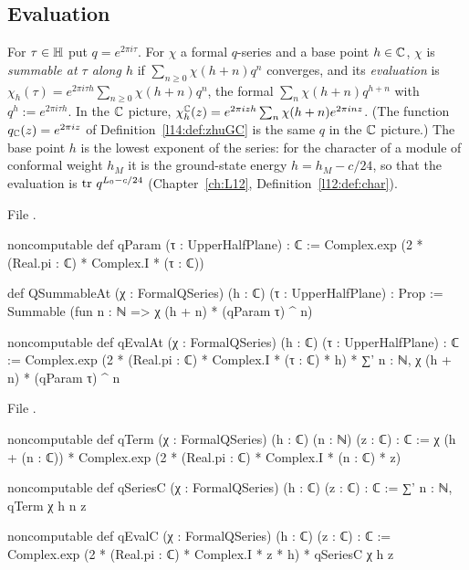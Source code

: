 \subsection{Evaluation}

\begin{definition}\label{l14:def:qeval}
For $\tau\in\mathbb{H}$ put $q = e^{2\pi i\tau}$. For $\chi$ a formal $q$-series and a base point $h\in{\mathbb{C}}$, $\chi$ is
\emph{summable at $\tau$ along $h$} if $\sum_{n\ge0}\chi(h+n)q^n$ converges, and its \emph{evaluation} is
$\chi_h(\tau) = e^{2\pi i\tau h}\sum_{n\ge0}\chi(h+n)q^n$, the formal $\sum_n\chi(h+n)q^{h+n}$ with $q^h := e^{2\pi i\tau h}$.
In the ${\mathbb{C}}$ picture, $\chi_h^{{\mathbb{C}}}(z) = e^{2\pi izh}\sum_n\chi(h+n)e^{2\pi inz}$. (The function $q_{{\mathbb{C}}}(z) = e^{2\pi iz}$ of
Definition~\ref{l14:def:zhuGC} is the same $q$ in the ${\mathbb{C}}$ picture.) The base point $h$ is the lowest exponent of the series:
for the character of a module of conformal weight $h_M$ it is the ground-state energy $h = h_M - c/24$, so that the evaluation
is $\operatorname{tr}\,q^{L_0-c/24}$ (Chapter~\ref{ch:L12}, Definition~\ref{l12:def:char}).
\end{definition}
\noindent File .
\begin{leancode}
noncomputable def qParam (τ : UpperHalfPlane) : ℂ :=
  Complex.exp (2 * (Real.pi : ℂ) * Complex.I * (τ : ℂ))

def QSummableAt (χ : FormalQSeries) (h : ℂ) (τ : UpperHalfPlane) : Prop :=
  Summable (fun n : ℕ => χ (h + n) * (qParam τ) ^ n)

noncomputable def qEvalAt (χ : FormalQSeries) (h : ℂ) (τ : UpperHalfPlane) : ℂ :=
  Complex.exp (2 * (Real.pi : ℂ) * Complex.I * (τ : ℂ) * h) *
    ∑' n : ℕ, χ (h + n) * (qParam τ) ^ n
\end{leancode}
\noindent File .
\begin{leancode}
noncomputable def qTerm (χ : FormalQSeries) (h : ℂ) (n : ℕ) (z : ℂ) : ℂ :=
  χ (h + (n : ℂ)) * Complex.exp (2 * (Real.pi : ℂ) * Complex.I * (n : ℂ) * z)

noncomputable def qSeriesC (χ : FormalQSeries) (h : ℂ) (z : ℂ) : ℂ := ∑' n : ℕ, qTerm χ h n z

noncomputable def qEvalC (χ : FormalQSeries) (h : ℂ) (z : ℂ) : ℂ :=
  Complex.exp (2 * (Real.pi : ℂ) * Complex.I * z * h) * qSeriesC χ h z
\end{leancode}
